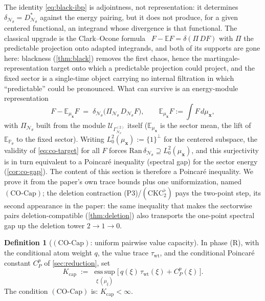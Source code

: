 \documentclass[reqno,final,11pt]{amsart}
\theoremstyle{plain}
\theoremstyle{definition}
\newtheorem{definition}[theorem]{Definition}
\theoremstyle{remark}
\newcommand{\E}{\mathbb E}
\newcommand{\Prob}{\mathbb P}
\newcommand{\cN}{\mathcal N}
\newcommand{\cU}{\mathcal U}
\newcommand{\GamN}{\Gamma^{(2)}_{\cN_\theta}}
\newcommand{\DN}{D_{\cN_\theta}}
\newcommand{\divN}{\delta_{\cN_\theta}}
\newcommand{\Pth}{\Prob_{\theta}}
\newcommand{\PiN}{\Pi_{\cN_\theta}}
\newcommand{\COcap}{(\mathrm{CO\text{-}Cap})}
\newcommand{\Ltwoz}{L^2_0}
\begin{document}
The identity \eqref{eq:black-ibp} is adjointness, not representation: it
determines $\divN=\DN^{*}$ against the energy pairing, but it does not produce,
for a given centered functional, an integrand whose divergence is that
functional. The classical upgrade is the Clark--Ocone
formula~\citep{Clark,Ocone,Nualart}
$F-\E F=\delta(\Pi\,DF)$ with $\Pi$ the predictable projection onto adapted
integrands, and both of its supports are gone here: blackness (\cref{thm:black})
removes the first chaos, hence the martingale-representation target onto which a
predictable projection could project, and the fixed sector is a single-time
object carrying no internal filtration in which ``predictable'' could be
pronounced. What can survive is an energy-module representation
\begin{equation}\label{eq:co-target}
  F-\E_{\mu_{\mathbf x}}F\;=\;\divN\bigl(\PiN\,\DN F\bigr),
  \qquad \E_{\mu_{\mathbf x}}F:=\textstyle\int F\,d\mu_{\mathbf x},
\end{equation}
with $\PiN$ built from the module $\cU_{\GamN}$ itself ($\E_{\mu_{\mathbf x}}$ is
the sector mean, the lift of $\E_{\Pth}$ to the fixed sector). Writing
$\Ltwoz(\mu_{\mathbf x}):=\{1\}^{\perp}$ for the centered subspace, the validity
of \eqref{eq:co-target} for all $F$ forces
$\mathrm{Ran}\,\divN\supseteq\Ltwoz(\mu_{\mathbf x})$, and this surjectivity is in
turn equivalent to a Poincar\'e inequality (spectral gap) for the sector energy
(\cref{cor:co-gap}). The content of this section is therefore a Poincar\'e
inequality. We prove it from the paper's own trace bounds plus one
uniformization, named $\COcap$; the deletion contraction
\textnormal{(P3)}/$(\mathrm{CKC}_2^{\flat})$ pays the two-point step, its second
appearance in the paper: the same inequality that makes the sectorwise pairs
deletion-compatible (\cref{thm:deletion}) also transports the one-point spectral
gap up the deletion tower $2\to1\to0$.

\begin{definition}[$\COcap$: uniform pairwise value capacity]\label{def:cocap}
In phase \textnormal{(R)}, with the conditional atom weight $q$, the value trace
$\tau_{\mathrm{wt}}$, and the conditional Poincar\'e constant $C^p_P$ of
\cref{sec:reduction}, set
\[
  K_{\mathrm{cap}}\;:=\;\operatorname*{ess\,sup}_{\xi\ (\mu_\xi)}
  \bigl[\,q(\xi)\,\tau_{\mathrm{wt}}(\xi)+C^p_P(\xi)\,\bigr].
\]
The condition $\COcap$ is: $K_{\mathrm{cap}}<\infty$.
\end{definition}
\end{document}
